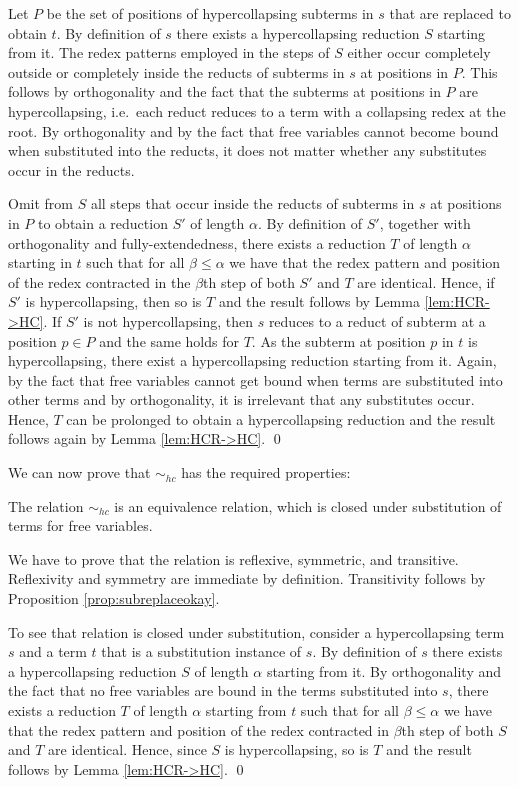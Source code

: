 \documentclass{LMCS}
\theoremstyle{plain}
\theoremstyle{definition}
\newcommand{\simhc}{\sim_{hc}}
\begin{document}
\proof
Let $P$ be the set of positions of hypercollapsing subterms in $s$ that are replaced to obtain $t$. By definition of $s$ there exists a hypercollapsing reduction $S$ starting from it. The redex patterns employed in the steps of $S$ either occur completely outside or completely inside the reducts of subterms in $s$ at positions in $P$. This follows by orthogonality and the fact that the subterms at positions in $P$ are hypercollapsing, i.e.\ each reduct reduces to a term with a collapsing redex at the root. By orthogonality and by the fact that free variables cannot become bound when substituted into the reducts, it does not matter whether any substitutes occur in the reducts.

Omit from $S$ all steps that occur inside the reducts of subterms in $s$ at positions in $P$ to obtain a reduction $S'$ of length $\alpha$. By definition of $S'$, together with orthogonality and fully-extendedness, there exists a reduction $T$ of length $\alpha$ starting in $t$ such that for all $\beta \leq \alpha$ we have that the redex pattern and position of the redex contracted in the $\beta$th step of both $S'$ and $T$ are identical. Hence, if $S'$ is hypercollapsing, then so is $T$ and the result follows by Lemma \ref{lem:HCR->HC}. If $S'$ is not hypercollapsing, then $s$ reduces to a reduct of subterm at a position $p \in P$ and the same holds for $T$. As the subterm at position $p$ in $t$ is hypercollapsing, there exist a hypercollapsing reduction starting from it. Again, by the fact that free variables cannot get bound when terms are substituted into other terms and by orthogonality, it is irrelevant that any substitutes occur. Hence, $T$ can be prolonged to obtain a hypercollapsing reduction and the result follows again by Lemma \ref{lem:HCR->HC}. \qed

We can now prove that $\simhc$ has the required properties:
\begin{prop}
\label{prop:equiv}
The relation $\simhc$ is an equivalence relation, which is closed under substitution of terms for free variables.
\end{prop}

\proof
We have to prove that the relation is reflexive, symmetric, and transitive. Reflexivity and symmetry are immediate by definition. Transitivity follows by Proposition \ref{prop:subreplaceokay}.

To see that relation is closed under substitution, consider a hypercollapsing term $s$ and a term $t$ that is a substitution instance of $s$. By definition of $s$ there exists a hypercollapsing reduction $S$ of length $\alpha$ starting from it. By orthogonality and the fact that no free variables are bound in the terms substituted into $s$, there exists a reduction $T$ of length $\alpha$ starting from $t$ such that for all $\beta \leq \alpha$ we have that the redex pattern and position of the redex contracted in $\beta$th step of both $S$ and $T$ are identical. Hence, since $S$ is hypercollapsing, so is $T$ and the result follows by Lemma \ref{lem:HCR->HC}. \qed
\end{document}
